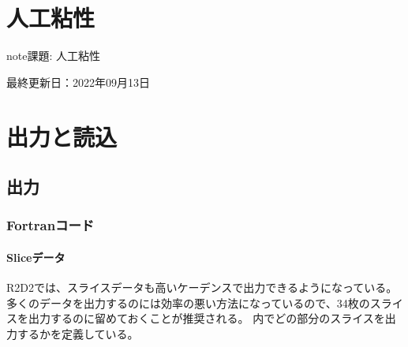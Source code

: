 \documentclass[letterpaper,10pt,dvipdfmx,report]{sphinxmanual}
\begin{document}
\sphinxstepscope


\chapter{人工粘性}
\label{\detokenize{artdif:id1}}\label{\detokenize{artdif::doc}}
\begin{sphinxadmonition}{note}{\label{\detokenize{artdif:id2}}課題:}
\sphinxAtStartPar
人工粘性
\end{sphinxadmonition}

\sphinxAtStartPar
最終更新日：2022年09月13日

\sphinxstepscope


\chapter{出力と読込}
\label{\detokenize{io:id1}}\label{\detokenize{io::doc}}

\section{出力}
\label{\detokenize{io:id2}}

\subsection{Fortranコード}
\label{\detokenize{io:fortran}}

\subsubsection{Sliceデータ}
\label{\detokenize{io:slice}}
\sphinxAtStartPar
R2D2では、スライスデータも高いケーデンスで出力できるようになっている。多くのデータを出力するのには効率の悪い方法になっているので、3\sphinxhyphen{}4枚のスライスを出力するのに留めておくことが推奨される。  内でどの部分のスライスを出力するかを定義している。

\begin{sphinxVerbatim}[commandchars=\\\{\}]
\end{sphinxVerbatim}
\end{document}

